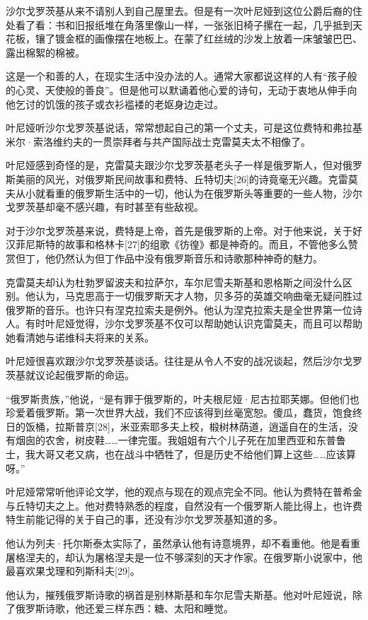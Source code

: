 沙尔戈罗茨基从来不请别人到自己屋里去。但是有一次叶尼娅到这位公爵后裔的住处看了看：书和旧报纸堆在角落里像山一样，一张张旧椅子摞在一起，几乎抵到天花板，镶了镀金框的画像摆在地板上。在蒙了红丝绒的沙发上放着一床皱皱巴巴、露出棉絮的棉被。

这是一个和善的人，在现实生活中没办法的人。通常大家都说这样的人有“孩子般的心灵、天使般的善良”。但是他可以默诵着他心爱的诗句，无动于衷地从伸手向他乞讨的饥饿的孩子或衣衫褴褛的老妪身边走过。

叶尼娅听沙尔戈罗茨基说话，常常想起自己的第一个丈夫，可是这位费特和弗拉基米尔·索洛维约夫的一贯崇拜者与共产国际战士克雷莫夫太不相像了。

叶尼娅感到奇怪的是，克雷莫夫跟沙尔戈罗茨基老头子一样是俄罗斯人，但对俄罗斯美丽的风光，对俄罗斯民间故事和费特、丘特切夫[26]的诗竟毫无兴趣。克雷莫夫从小就看重的俄罗斯生活中的一切，他认为在俄罗斯头等重要的一些人物，沙尔戈罗茨基却毫不感兴趣，有时甚至有些敌视。

对于沙尔戈罗茨基来说，费特是上帝，首先是俄罗斯的上帝。对于他来说，关于好汉菲尼斯特的故事和格林卡[27]的组歌《彷徨》都是神奇的。而且，不管他多么赞赏但丁，他仍然认为但丁作品中没有俄罗斯音乐和诗歌那种神奇的魅力。

克雷莫夫却认为杜勃罗留波夫和拉萨尔，车尔尼雪夫斯基和恩格斯之间没什么区别。他认为，马克思高于一切俄罗斯天才人物，贝多芬的英雄交响曲毫无疑问胜过俄罗斯的音乐。也许只有涅克拉索夫是例外。他认为涅克拉索夫是全世界第一位诗人。有时叶尼娅觉得，沙尔戈罗茨基不仅可以帮助她认识克雷莫夫，而且可以帮助她看清她与诺维科夫将来的关系。

叶尼娅很喜欢跟沙尔戈罗茨基谈话。往往是从令人不安的战况谈起，然后沙尔戈罗茨基就议论起俄罗斯的命运。

“俄罗斯贵族，”他说，“是有罪于俄罗斯的，叶夫根尼娅·尼古拉耶芙娜。但他们也珍爱着俄罗斯。第一次世界大战，我们不应该得到丝毫宽恕。傻瓜，蠢货，饱食终日的饭桶，拉斯普京[28]，米亚索耶多夫上校，椴树林荫道，逍遥自在的生活，没有烟囱的农舍，树皮鞋……一律完蛋。我姐姐有六个儿子死在加里西亚和东普鲁士，我大哥又老又病，也在战斗中牺牲了，但是历史不给他们算上这些……应该算呀。”

叶尼娅常常听他评论文学，他的观点与现在的观点完全不同。他认为费特在普希金与丘特切夫之上。他对费特熟悉的程度，自然没有一个俄罗斯人能比得上，也许费特生前能记得的关于自己的事，还没有沙尔戈罗茨基知道的多。

他认为列夫·托尔斯泰太实际了，虽然承认他有诗意境界，却不看重他。他是看重屠格涅夫的，却认为屠格涅夫是一位不够深刻的天才作家。在俄罗斯小说家中，他最喜欢果戈理和列斯科夫[29]。

他认为，摧残俄罗斯诗歌的祸首是别林斯基和车尔尼雪夫斯基。他对叶尼娅说，除了俄罗斯诗歌，他还爱三样东西：糖、太阳和睡觉。

